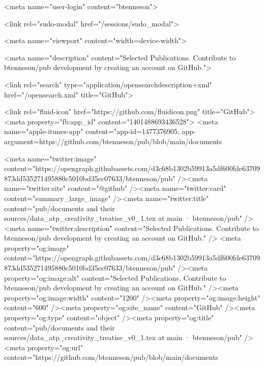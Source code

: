   




    <meta name="user-login" content="btenneson">

  <link rel="sudo-modal" href="/sessions/sudo_modal">

    <meta name="viewport" content="width=device-width">

    

      <meta name="description" content="Selected Publications. Contribute to btenneson/pub development by creating an account on GitHub.">

      <link rel="search" type="application/opensearchdescription+xml" href="/opensearch.xml" title="GitHub">

    <link rel="fluid-icon" href="https://github.com/fluidicon.png" title="GitHub">
    <meta property="fb:app_id" content="1401488693436528">
    <meta name="apple-itunes-app" content="app-id=1477376905, app-argument=https://github.com/btenneson/pub/blob/main/documents%

      <meta name="twitter:image" content="https://opengraph.githubassets.com/d3c68b1302b59913a5df600fde63709873dd535271495880c5010bd35ec07633/btenneson/pub" /><meta name="twitter:site" content="@github" /><meta name="twitter:card" content="summary_large_image" /><meta name="twitter:title" content="pub/documents and their sources/data_atp_creativity_treatise_v0_1.tex at main · btenneson/pub" /><meta name="twitter:description" content="Selected Publications. Contribute to btenneson/pub development by creating an account on GitHub." />
  <meta property="og:image" content="https://opengraph.githubassets.com/d3c68b1302b59913a5df600fde63709873dd535271495880c5010bd35ec07633/btenneson/pub" /><meta property="og:image:alt" content="Selected Publications. Contribute to btenneson/pub development by creating an account on GitHub." /><meta property="og:image:width" content="1200" /><meta property="og:image:height" content="600" /><meta property="og:site_name" content="GitHub" /><meta property="og:type" content="object" /><meta property="og:title" content="pub/documents and their sources/data_atp_creativity_treatise_v0_1.tex at main · btenneson/pub" /><meta property="og:url" content="https://github.com/btenneson/pub/blob/main/documents%
  


